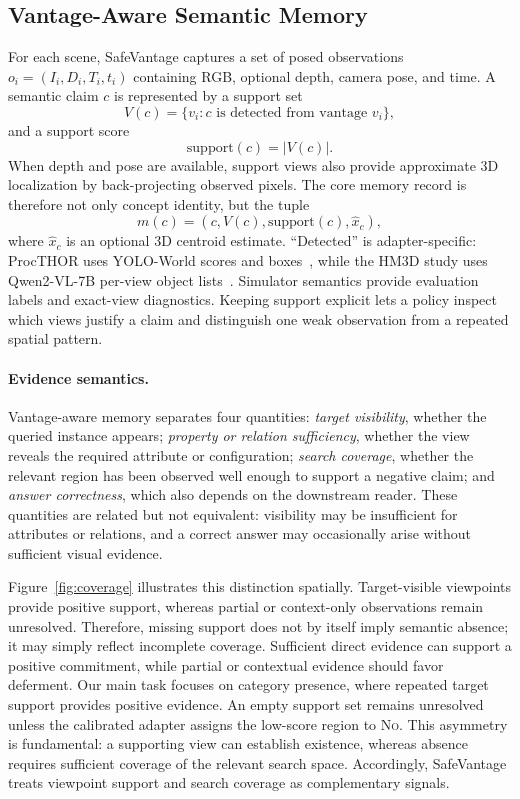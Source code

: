 \documentclass{article}
\newcommand{\method}{SafeVantage}
\newcommand{\support}{\mathrm{support}}
\begin{document}
\subsection{Vantage-Aware Semantic Memory}
For each scene, \method{} captures a set of posed observations $o_i=(I_i,D_i,T_i,t_i)$ containing RGB, optional depth, camera pose, and time. A semantic claim $c$ is represented by a support set
\begin{equation}
  V(c) = \{v_i : c \text{ is detected from vantage } v_i\},
\end{equation}
and a support score
\begin{equation}
  \support(c) = |V(c)|.
\end{equation}
When depth and pose are available, support views also provide approximate 3D localization by back-projecting observed pixels. The core memory record is therefore not only concept identity, but the tuple
\begin{equation}
  m(c) = (c, V(c), \support(c), \hat{x}_c),
\end{equation}
where $\hat{x}_c$ is an optional 3D centroid estimate. ``Detected'' is adapter-specific: ProcTHOR uses YOLO-World scores and boxes~\citep{cheng2024yoloworld}, while the HM3D study uses Qwen2-VL-7B per-view object lists~\citep{wang2024qwen2vl}. Simulator semantics provide evaluation labels and exact-view diagnostics. Keeping support explicit lets a policy inspect which views justify a claim and distinguish one weak observation from a repeated spatial pattern.

\paragraph{Evidence semantics.}
Vantage-aware memory separates four quantities: \emph{target visibility},
whether the queried instance appears; \emph{property or relation sufficiency},
whether the view reveals the required attribute or configuration;
\emph{search coverage}, whether the relevant region has been observed well
enough to support a negative claim; and \emph{answer correctness}, which
also depends on the downstream reader. These quantities are related but not
equivalent: visibility may be insufficient for attributes or relations, and
a correct answer may occasionally arise without sufficient visual evidence.

Figure~\ref{fig:coverage} illustrates this distinction spatially.
Target-visible viewpoints provide positive support, whereas partial or
context-only observations remain unresolved. Therefore, missing support does
not by itself imply semantic absence; it may simply reflect incomplete
coverage. Sufficient direct evidence can support a positive commitment,
while partial or contextual evidence should favor deferment.
Our main task focuses on category presence, where repeated target support
provides positive evidence. An empty support set remains unresolved unless
the calibrated adapter assigns the low-score region to \textsc{No}.
This asymmetry is fundamental: a supporting view can establish existence,
whereas absence requires sufficient coverage of the relevant search space.
Accordingly, SafeVantage treats viewpoint support and search coverage as
complementary signals.
\end{document}
